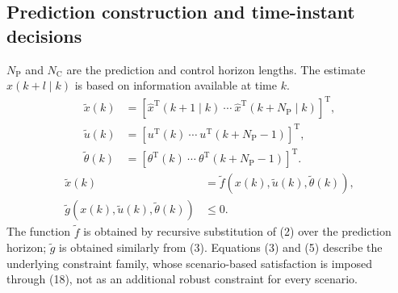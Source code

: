 \documentclass{article}
\begin{document}
\subsection*{Prediction construction and time-instant decisions}
$N_{\mathrm P}$ and $N_{\mathrm C}$ are the prediction and control horizon lengths. The estimate $\hat x(k+l\mid k)$ is based on information available at time $k$.
\[
\begin{aligned}
\tilde x(k)&=[\hat x^{\mathrm T}(k+1\mid k)\ \cdots\ \hat x^{\mathrm T}(k+N_{\mathrm P}\mid k)]^{\mathrm T},\\
\tilde u(k)&=[u^{\mathrm T}(k)\ \cdots\ u^{\mathrm T}(k+N_{\mathrm P}-1)]^{\mathrm T},\\
\tilde\theta(k)&=[\theta^{\mathrm T}(k)\ \cdots\ \theta^{\mathrm T}(k+N_{\mathrm P}-1)]^{\mathrm T}.
\end{aligned}
\]
\begin{align}
\tilde x(k)&=\tilde f(x(k),\tilde u(k),\tilde\theta(k)), \tag{4}\\
\tilde g(x(k),\tilde u(k),\tilde\theta(k))&\leq0. \tag{5}
\end{align}
The function $\tilde f$ is obtained by recursive substitution of (2) over the prediction horizon; $\tilde g$ is obtained similarly from (3). Equations (3) and (5) describe the underlying constraint family, whose scenario-based satisfaction is imposed through (18), not as an additional robust constraint for every scenario.
\end{document}
